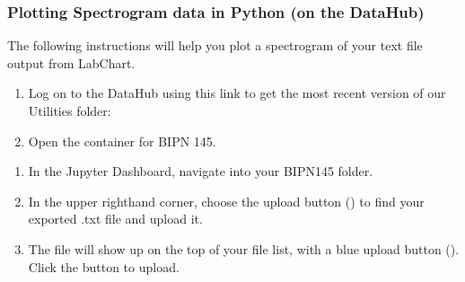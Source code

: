 \documentclass[letterpaper,10pt,english]{jupyterBook}
\begin{document}
\sphinxAtStartPar
{}


\subsubsection{Plotting Spectrogram data in Python (on the DataHub)}
\label{\detokenize{EEG:plotting-spectrogram-data-in-python-on-the-datahub}}
\sphinxAtStartPar
The following instructions will help you plot a spectrogram of your text file output from LabChart.

\sphinxAtStartPar
{}
\begin{enumerate}
%
\item {} 
\sphinxAtStartPar
Log on to the DataHub using this link to get the most recent version of our Utilities folder: 

\item {} 
\sphinxAtStartPar
Open the container for BIPN 145.

\end{enumerate}

\sphinxAtStartPar
{}
\begin{enumerate}
%
\item {} 
\sphinxAtStartPar
In the Jupyter Dashboard, navigate into your BIPN145 folder.

\item {} 
\sphinxAtStartPar
In the upper right\sphinxhyphen{}hand corner, choose the upload button () to find your exported .txt file and upload it.

\item {} 
\sphinxAtStartPar
The file will show up on the top of your file list, with a blue upload button (). Click the button to upload.

\end{enumerate}
\end{document}
